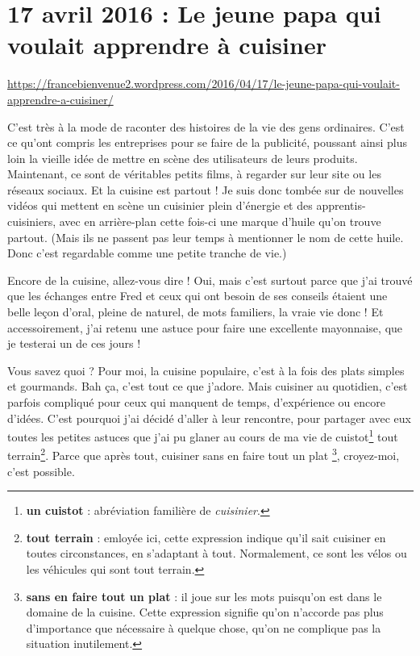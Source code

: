 \documentclass[11pt, french]{report}
\begin{document}
\vfill

\chapter{17 avril 2016 : Le jeune papa qui voulait apprendre à cuisiner}

\url{https://francebienvenue2.wordpress.com/2016/04/17/le-jeune-papa-qui-voulait-apprendre-a-cuisiner/}

\vfill

C’est très à la mode de raconter des histoires de la vie des gens ordinaires.
C’est ce qu’ont compris les entreprises pour se faire de la publicité, poussant
ainsi plus loin la vieille idée de mettre en scène des utilisateurs de leurs
produits. Maintenant, ce sont de véritables petits films, à regarder sur leur
site ou les réseaux sociaux. Et la cuisine est partout ! Je suis donc tombée sur
de nouvelles vidéos qui mettent en scène un cuisinier plein d’énergie et des
apprentis-cuisiniers, avec en arrière-plan cette fois-ci une marque d’huile
qu’on trouve partout. (Mais ils ne passent pas leur temps à mentionner le nom
de cette huile. Donc c’est regardable comme une petite tranche de vie.)

Encore de la cuisine, allez-vous dire ! Oui, mais c’est surtout parce que j’ai
trouvé que les échanges entre Fred et ceux qui ont besoin de ses conseils étaient
une belle leçon d’oral, pleine de naturel, de mots familiers, la vraie vie donc !
Et accessoirement, j’ai retenu une astuce pour faire une excellente mayonnaise,
que je testerai un de ces jours !

\vfill

Vous savez quoi ? Pour moi, la cuisine populaire, c’est à la fois des plats
simples et gourmands. Bah ça, c’est tout ce que j’adore. Mais cuisiner au
quotidien, c’est parfois compliqué pour ceux qui manquent de temps, d’expérience
ou encore d’idées. C’est pourquoi j’ai décidé d’aller à leur rencontre, pour
partager avec eux toutes les petites astuces que j’ai pu glaner au cours de ma
vie de cuistot\footnote{\textbf{un cuistot} : abréviation familière de
  \textit{cuisinier}.} tout terrain\footnote{\textbf{tout terrain} : emloyée ici,
  cette expression indique qu’il sait cuisiner en toutes circonstances, en
  s’adaptant à tout. Normalement, ce sont les vélos ou les véhicules qui sont
  tout terrain.}. Parce que après tout, cuisiner sans en faire tout un plat
\footnote{\textbf{sans en faire tout un plat} : il joue sur les mots puisqu’on
  est dans le domaine de la cuisine. Cette expression signifie qu’on n’accorde
  pas plus d’importance que nécessaire à quelque chose, qu’on ne complique pas
  la situation inutilement.}, croyez-moi, c’est possible.
\end{document}
